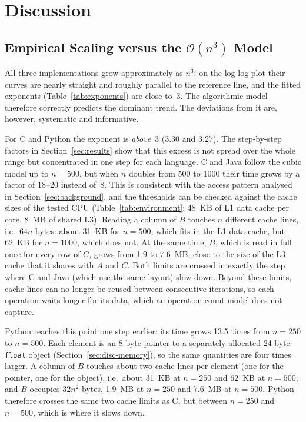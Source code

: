\documentclass[conference,a4paper]{IEEEtran}
\newcommand{\bigO}[1]{\mathcal{O}\!\left(#1\right)}
\newcommand{\code}[1]{\texttt{#1}}
\begin{document}
\section{Discussion}
\label{sec:discussion}

\subsection{Empirical Scaling versus the \texorpdfstring{$\bigO{n^3}$}{O(n\textthreesuperior)} Model}
All three implementations grow approximately as $n^3$: on the log-log plot their
curves are nearly straight and roughly parallel to the reference line, and the
fitted exponents (Table~\ref{tab:exponents}) are close to~3. The algorithmic
model therefore correctly predicts the dominant trend. The deviations from it
are, however, systematic and informative.

For C and Python the exponent is \emph{above}~3 (3.30 and 3.27). The
step-by-step factors in Section~\ref{sec:results} show that this excess is not
spread over the whole range but concentrated in one step for each language. C
and Java follow the cubic model up to $n=500$, but when $n$ doubles from 500 to
1000 their time grows by a factor of 18--20 instead of~8. This is consistent
with the access pattern analysed in Section~\ref{sec:background}, and the
thresholds can be checked against the cache sizes of the tested CPU
(Table~\ref{tab:environment}: 48~KB of L1 data cache per core, 8~MB of shared
L3). Reading a column of $B$ touches $n$ different cache lines, i.e.\ $64n$
bytes: about 31~KB for $n=500$, which fits in the L1 data cache, but 62~KB for
$n=1000$, which does not. At the same time, $B$, which is read in full once for
every row of $C$, grows from 1.9 to 7.6~MB, close to the size of the L3 cache
that it shares with $A$ and $C$. Both limits are crossed in exactly the step
where C and Java (which use the same layout) slow down. Beyond these limits,
cache lines can no longer be reused between consecutive iterations, so each
operation waits longer for its data, which an operation-count model does not
capture.

Python reaches this point one step earlier: its time grows 13.5 times from
$n=250$ to $n=500$. Each element is an 8-byte pointer to a separately allocated
24-byte \code{float} object (Section~\ref{sec:disc-memory}), so the same
quantities are four times larger. A column of $B$ touches about two cache lines
per element (one for the pointer, one for the object), i.e.\ about 31~KB at
$n=250$ and 62~KB at $n=500$, and $B$ occupies $32n^2$ bytes, 1.9~MB at
$n=250$ and 7.6~MB at $n=500$. Python therefore crosses the same two cache
limits as C, but between $n=250$ and $n=500$, which is where it slows down.
\end{document}
